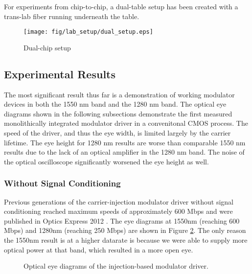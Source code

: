 For experiments from chip-to-chip, a dual-table setup has been created with a trans-lab fiber running underneath the table.
	\begin{figure}[ht]
		\begin{center}
			\texttt{[image: fig/lab\_setup/dual\_setup.eps]}
			\caption{\label{fig:dual_setup}Dual-chip setup}
		\end{center}
	\end{figure}


\subsection{Experimental Results}
	  The most significant result thus far is a demonstration of working modulator devices in both the 1550 nm band and the 1280 nm band.  The optical eye diagrams shown in the following subsections demonstrate the first measured monolithically integrated modulator driver in a convenitonal CMOS process.  The speed of the driver, and thus the eye width, is limited largely by the carrier lifetime.  The eye height for 1280 nm results are worse than comparable 1550 nm results due to the lack of an optical amplifier in the 1280 nm band.  The noise of the optical oscilloscope significantly worsened the eye height as well.

\subsubsection{Without Signal Conditioning}
Previous generations of the carrier-injection modulator driver without signal conditioning reached maximum speeds of approximately 600 Mbps and were published in Optics Express 2012 \cite{orcutt_optex12}.  The eye diagrams at 1550nm (reaching 600 Mbps) and 1280nm (reaching 250 Mbps) are shown in Figure \ref{fig:eye_diagrams}.  The only reason the 1550nm result is at a higher datarate is because we were able to supply more optical power at that band, which resulted in a more open eye.

	\begin{figure}[H]
		\begin{center}
		\end{center}
		\caption{\label{fig:eye_diagrams}Optical eye diagrams of the injection-based modulator driver.}
	\end{figure}

